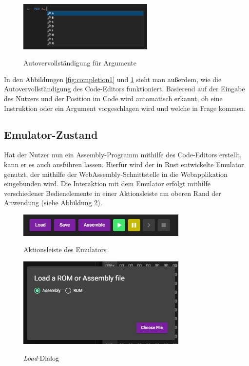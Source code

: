\begin{figure}
    \caption{Autovervollständigung für Argumente}
    \centering
    \includegraphics[width=0.6\textwidth]{Bilder/Completion_2.png}
    \label{fig:completion2}
\end{figure}

In den Abbildungen \ref{fig:completion1} und \ref{fig:completion2} sieht man außerdem, wie die Autovervollständigung des Code-Editors funktioniert. Basierend auf der Eingabe des Nutzers und der Position im Code wird automatisch erkannt, ob eine Instruktion oder ein Argument vorgeschlagen wird und welche in Frage kommen.

\subsection{Emulator-Zustand}

Hat der Nutzer nun ein Assembly-Programm mithilfe des Code-Editors erstellt, kann er es auch ausführen lassen. Hierfür wird der in Rust entwickelte Emulator genutzt, der mithilfe der WebAssembly-Schnittstelle in die Webapplikation eingebunden wird. Die Interaktion mit dem Emulator erfolgt mithilfe verschiedener Bedienelemente in einer Aktionsleiste am oberen Rand der Anwendung (siehe Abbildung \ref{fig:actionbar}).

\begin{figure}[h]
    \caption{Aktionsleiste des Emulators}
    \centering
    \includegraphics[width=0.75\textwidth]{Bilder/Aktionsleiste.png}
    \label{fig:actionbar}
\end{figure}

\begin{figure}
    \caption{\textit{Load}-Dialog}
    \centering
    \includegraphics[width=0.75\textwidth]{Bilder/Load_Dialog.png}
    \label{fig:loaddialog}
\end{figure}

